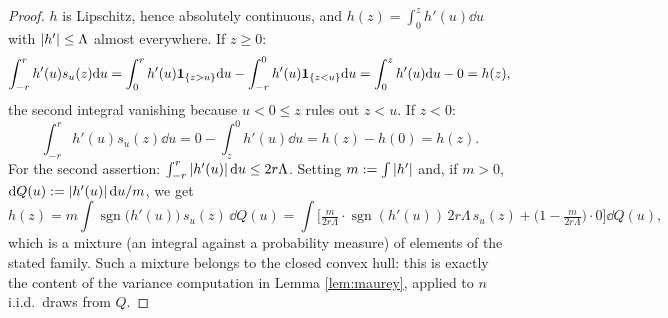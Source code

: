 \documentclass[11pt,a4paper]{article}
\begin{document}
\begin{proof}
$h$ is Lipschitz, hence absolutely continuous, and $h(z) = \int_0^z h'(u)\dd u$ with
$\left\lvert h' \right\rvert \le \Lambda$ almost everywhere. If $z \ge 0$:
\[
\int_{-r}^r h'(u)s_u(z)\mathrm{d} u
= \int_{0}^{r} h'(u)\mathbf{1}_{\{z>u\}}\mathrm{d} u - \int_{-r}^{0} h'(u)\mathbf{1}_{\{z<u\}}\mathrm{d} u
= \int_0^z h'(u)\mathrm{d} u - 0 = h(z),
\]
the second integral vanishing because $u < 0 \le z$ rules out $z < u$. If $z < 0$:
\[
\int_{-r}^r h'(u)s_u(z)\dd u = 0 - \int_{z}^{0} h'(u)\dd u = h(z) - h(0) = h(z).
\]
For the second assertion: $\int_{-r}^r \left\lvert h'(u) \right\rvert\mathrm{d} u \le 2r\Lambda$. Setting
$m := \int \left\lvert h' \right\rvert$ and, if $m>0$, $\mathrm{d} Q(u) := \left\lvert h'(u) \right\rvert\mathrm{d} u / m$, we get
\[
h(z) = m \int \operatorname{sgn}\big(h'(u)\big)\, s_u(z)\, \dd Q(u)
= \int \Big[ \tfrac{m}{2r\Lambda}\cdot \operatorname{sgn}(h'(u))\, 2r\Lambda\, s_u(z)
+ \big(1 - \tfrac{m}{2r\Lambda}\big)\cdot 0 \Big]\dd Q(u),
\]
which is a mixture (an integral against a probability measure) of elements of the stated family.
Such a mixture belongs to the closed convex hull: this is exactly the content of the variance
computation in Lemma \ref{lem:maurey}, applied to $n$ i.i.d.\ draws from $Q$.
\end{proof}
\end{document}
